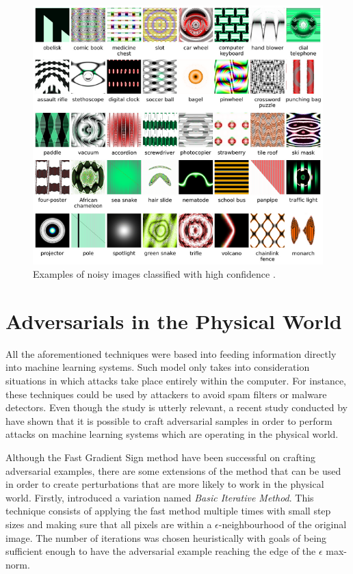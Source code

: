 \begin{figure}[!h]
	\centering
	\includegraphics[scale=1.]{unrec_images.png}
	\caption{Examples of noisy images classified with high confidence \cite{nguyen2015}.}
	\label{fig:unrec_images}
\end{figure}


\section{Adversarials in the Physical World}\label{sec:physical}

All the aforementioned techniques were based into feeding information directly into machine learning systems. Such model only takes into consideration situations in which attacks take place entirely within the computer. For instance, these techniques could be used by attackers to avoid spam filters or malware detectors. Even though the study is utterly relevant, a recent study conducted by \cite{goodfellow2016} have shown that it is possible to craft adversarial samples in order to perform attacks on machine learning systems which are operating in the physical world.

Although the Fast Gradient Sign method have been successful on crafting adversarial examples, there are some extensions of the method that can be used in order to create perturbations that are more likely to work in the physical world. Firstly, \cite{goodfellow2016} introduced a variation named \textit{Basic Iterative Method}. This technique consists of applying the fast method multiple times with small step sizes and making sure that all pixels are within a $\epsilon$-neighbourhood of the original image. The number of iterations was chosen heuristically with goals of being sufficient enough to have the adversarial example reaching the edge of the $\epsilon$ max-norm.

